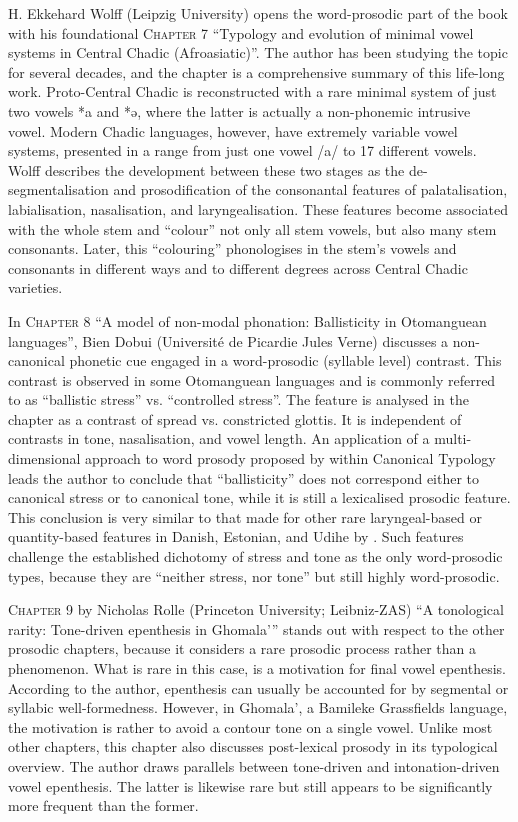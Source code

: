 \documentclass[output=paper]{langscibook}
\begin{document}
H. Ekkehard Wolff (Leipzig University) opens the word-prosodic part of the book with his foundational \textsc{Chapter 7} “Typology and evolution of minimal vowel systems in Central Chadic (Afroasiatic)”. The author has been studying the topic for several decades, and the chapter is a comprehensive summary of this life-long work. Proto-Central Chadic is reconstructed with a rare minimal system of just two vowels *a and *ə, where the latter is actually a non-phonemic intrusive vowel. Modern Chadic languages, however, have extremely variable vowel systems, presented in a range from just one vowel /a/ to 17 different vowels. Wolff describes the development between these two stages as the de-segmentalisation and prosodification of the consonantal features of palatalisation, labialisation, nasalisation, and laryngealisation. These features become associated with the whole stem and “colour” not only all stem vowels, but also many stem consonants. Later, this “colouring” phonologises in the stem’s vowels and consonants in different ways and to different degrees across Central Chadic varieties.

In \textsc{Chapter 8} “A model of non-modal phonation: Ballisticity in Otomanguean languages”, Bien Dobui (Université de Picardie Jules Verne) discusses a non-ca\-non\-i\-cal phonetic cue engaged in a word-prosodic (syllable level) contrast. This contrast is observed in some Otomanguean languages and is commonly referred to as “ballistic stress” vs. “controlled stress”. The feature is analysed in the chapter as a contrast of spread vs. constricted glottis. It is independent of contrasts in tone, nasalisation, and vowel length. An application of a multi-dimensional approach to word prosody proposed by \citet{Hyman2006,Hyman2014} within Canonical Typology leads the author to conclude that “ballisticity” does not correspond either to canonical stress or to canonical tone, while it is still a lexicalised prosodic feature. This conclusion is very similar to that made for other rare laryngeal-based or quantity-based features in Danish, Estonian, and Udihe by \citet{Kuznetsova2018, kuznetsova2022}. Such features challenge the established dichotomy of stress and tone as the only word-prosodic types, because they are “neither stress, nor tone” but still highly word-prosodic.

\textsc{Chapter 9} by Nicholas Rolle (Princeton University; Leibniz-ZAS) “A tonological rarity: Tone-driven epenthesis in Ghomala’” stands out with respect to the other prosodic chapters, because it considers a rare prosodic process rather than a phenomenon. What is rare in this case, is a motivation for final vowel epenthesis. According to the author, epenthesis can usually be accounted for by segmental or syllabic well-formedness. However, in Ghomala’, a Bamileke Grassfields language, the motivation is rather to avoid a contour tone on a single vowel. Unlike most other chapters, this chapter also discusses post-lexical prosody in its typological overview. The author draws parallels between tone-driven and intonation-driven vowel epenthesis. The latter is likewise rare but still appears to be significantly more frequent than the former.
\end{document}
